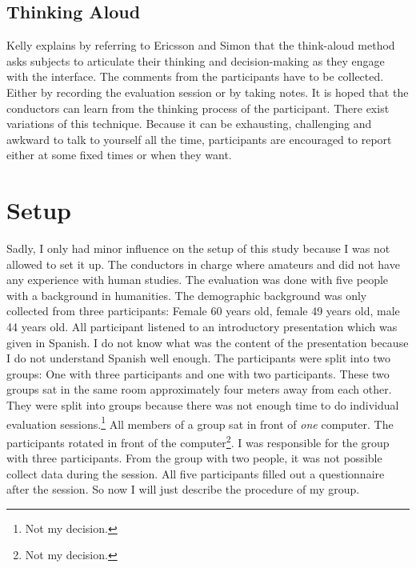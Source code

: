 \documentclass[11pt]{report}
\begin{document}
\subsection{Thinking Aloud}

Kelly \cite{Kelly2007} explains by referring to Ericsson and Simon \cite{Ericsson1993} that the think-aloud method asks subjects to articulate their thinking and decision-making as they engage with the interface. The comments from the participants have to be collected. Either by recording the evaluation session or by taking notes. It is hoped that the conductors can learn from the thinking process of the participant. There exist variations of this technique. Because it can be exhausting, challenging and awkward to talk to yourself all the time, participants are encouraged to report either at some fixed times or when they want.

\section{Setup}

Sadly, I only had minor influence on the setup of this study because I was not allowed to set it up. The conductors in charge where amateurs and did not have any experience with human studies. The evaluation was done with five people with a background in humanities. The demographic background was only collected from three participants: Female 60 years old, female 49 years old, male 44 years old. All participant listened to an introductory presentation which was given in Spanish. I do not know what was the content of the presentation because I do not understand Spanish well enough. The participants were split into two groups: One with three participants and one with two participants. These two groups sat in the same room approximately four meters away from each other. They were split into groups because there was not enough time to do individual evaluation sessions.\footnote{Not my decision.} All members of a group sat in front of \textit{one} computer. The participants rotated in front of the computer\footnote{Not my decision.}. I was responsible for the group with three participants. From the group with two people, it was not possible collect data during the session. All five participants filled out a questionnaire after the session. So now I will just describe the procedure of my group. \\
\end{document}
